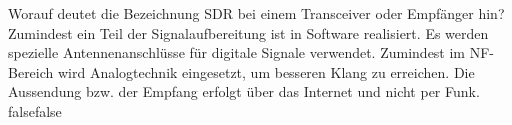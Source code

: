     {Worauf deutet die Bezeichnung SDR bei einem Transceiver oder Empfänger hin?}
    {Zumindest ein Teil der Signalaufbereitung ist in Software realisiert.}
    {Es werden spezielle Antennenanschlüsse für digitale Signale verwendet.}
    {Zumindest im NF-Bereich wird Analogtechnik eingesetzt, um besseren Klang zu erreichen.}
    {Die Aussendung bzw. der Empfang erfolgt über das Internet und nicht per Funk.}
    {false}{false}